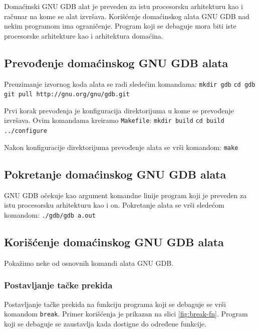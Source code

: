 \documentclass[12pt,oneside]{memoir}
\begin{document}
Domaćinski GNU GDB alat je preveden za istu procesorsku arhitekturu kao i računar na kome se alat izvršava. Korišćenje domaćinskog alata GNU GDB nad nekim programom ima ograničenje. Program koji se debaguje mora biti iste procesorske arhitekture kao i arhitektura domaćina.

\subsection{Prevođenje domaćinskog GNU GDB alata}

Preuzimanje izvornog koda alata se radi sledećim komandama:
\newline
\texttt{mkdir gdb}
\newline
\texttt{cd gdb}
\newline
\texttt{git pull http://gnu.org/gnu/gdb.git}

Prvi korak prevođenja je konfiguracija direktorijuma u kome se prevođenje izvršava. Ovim komandama kreiramo \texttt{Makefile}:
\newline
\texttt{mkdir build}
\newline
\texttt{cd build}
\newline
\texttt{../configure}

Nakon konfiguracije direktorijuma prevođenje alata se vrši komandom:
\newline
\texttt{make}

\subsection{Pokretanje domaćinskog GNU GDB alata}

GNU GDB očekuje kao argument komandne linije program koji je preveden za istu procesorsku arhitekturu kao i on. Pokretanje alata se vrši sledećom komandom:
\newline
\texttt{./gdb/gdb a.out}

\subsection{Korišćenje domaćinskog GNU GDB alata}

Pokažimo neke od osnovnih komandi alata GNU GDB.

\subsubsection{Postavljanje tačke prekida}

Postavljanje tačke prekida na funkciju programa koji se debaguje se vrši komandom \texttt{break}. Primer korišćenja je prikazan na slici \ref{fig:break-fn}. Program koji se debaguje se zaustavlja kada dostigne do određene funkcije.
\end{document}
